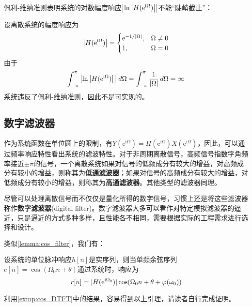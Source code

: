 佩利-维纳准则表明系统的对数幅度响应$\left|\ln\left|H(\mathrm{e}^{\mathrm{i}\Omega})\right|\right|$不能“陡峭截止”：
\begin{example}
    设离散系统的幅度响应为
    $$\left|H(\mathrm{e}^{\mathrm{i}\Omega})\right|=\begin{cases}
        \mathrm{e}^{-1/|\Omega|},&\Omega\neq 0\\
        1,&\Omega=0
    \end{cases}$$
    由于
    $$\int_{-\pi}^\pi \left|\ln\left|H(\mathrm{e}^{\mathrm{i}\Omega})\right|\right|\,d\Omega=\int_{-\pi}^\pi\frac{1}{|\Omega|}\,d\Omega=\infty$$
    系统违反了佩利-维纳准则，因此不是可实现的。
\end{example}

\subsection{数字滤波器}\label{sub:diital_filter}

作为系统函数在单位圆上的限制，有$Y(\mathrm{e}^{\mathrm{i}\Omega})=H(\mathrm{e}^{\mathrm{i}\Omega})X(\mathrm{e}^{\mathrm{i}\Omega})$，因此，可以通过频率响应特性看出系统的滤波特性。对于非周期离散信号，高频信号指数字角频率接近$\pm\pi$的信号，一个离散系统如果对信号的低频成分有较大的增益，对高频成分有较小的增益，则称其为\textbf{低通滤波器}；如果对信号的高频成分有较大的增益，对低频成分有较小的增益，则称其为\textbf{高通滤波器}。其他类型的滤波器同理。

尽管可以处理离散信号而不仅仅是量化所得的数字信号，习惯上还是将这些滤波器称作\textbf{数字滤波器}(digital filter)。数字滤波器大多可以看作对特定模拟滤波器的逼近，只是逼近的方式多种多样，且性能各不相同，需要根据实际的工程需求进行选择和设计。

类似\cref{lemma:cos_filter}，我们有：
\begin{lemma}\label{lemma:digital_cos_filter}
    设系统的单位脉冲响应$h[n]$是实序列，则当单频余弦序列$e[n]=\cos(\Omega_0 n+\theta)$通过系统时，响应为
    $$r[n]=|H(\mathrm{e}^{\mathrm{i}\Omega_0})|\cos(\Omega_0 n+\theta+\varphi(\omega_0))$$
\end{lemma}
利用\cref{exmp:cos_DTFT}中的结果，容易得到以上引理，请读者自行完成证明。

